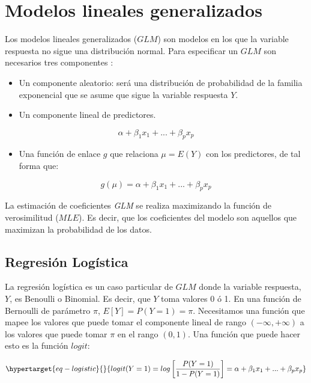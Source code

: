 \documentclass[
  12pt,
  a4paper,
  extrafontsizes,
  onecolumn,
  openright,
  table]{memoir}
\providecommand{\tightlist}{%
  \setlength{\itemsep}{0pt}\setlength{\parskip}{0pt}}\usepackage{longtable,booktabs,array}
\begin{document}
\hypertarget{sec-glm}{%
\section{Modelos lineales generalizados}\label{sec-glm}}

Los modelos lineales generalizados (\(GLM\)) son modelos en los que la
variable respuesta no sigue una distribución normal. Para especificar un
\(GLM\) son necesarios tres componentes
\autocite[ver][pp.~66-67]{agresti_2018}:

\begin{itemize}
\tightlist
\item
  Un componente aleatorio: será una distribución de probabilidad de la
  familia exponencial que se asume que sigue la variable respuesta
  \(Y\).
\item
  Un componente lineal de predictores.
\end{itemize}

\[
\alpha+\beta_1x_1+...+\beta_px_p
\]

\begin{itemize}
\tightlist
\item
  Una función de enlace \(g\) que relaciona \(\mu=E(Y)\) con los
  predictores, de tal forma que:
\end{itemize}

\[
g(\mu)=\alpha+\beta_1x_1+...+\beta_px_p
\]

La estimación de coeficientes \emph{GLM} se realiza maximizando la
función de verosimilitud (\(MLE\)). Es decir, que los coeficientes del
modelo son aquellos que maximizan la probabilidad de los datos.

\hypertarget{sec-logistica}{%
\subsection{Regresión Logística}\label{sec-logistica}}

La regresión logística \autocite[ver][pp.~68-69]{agresti_2018} es un
caso particular de \(GLM\) donde la variable respuesta, \(Y\), es
Benoulli o Binomial. Es decir, que \(Y\) toma valores 0 ó 1. En una
función de Bernoulli de parámetro \(\pi\), \(E[Y] = P(Y=1) = \pi\).
Necesitamos una función que mapee los valores que puede tomar el
componente lineal de rango \((-\infty, +\infty)\) a los valores que
puede tomar \(\pi\) en el rango \((0, 1)\). Una función que puede hacer
esto es la función \(logit\):

\begin{equation}\protect\hypertarget{eq-logistic}{}{
logit(Y=1) = log \left[\frac{P(Y=1)}{1-P(Y=1)} \right] = \alpha+\beta_1x_1+...+\beta_px_p
}\label{eq-logistic}\end{equation}
\end{document}
